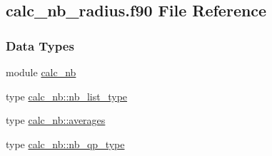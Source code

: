 \hypertarget{calc__nb__radius_8f90}{\subsection{calc\-\_\-nb\-\_\-radius.\-f90 File Reference}
\label{calc__nb__radius_8f90}
}
\subsubsection*{Data Types}
\begin{DoxyCompactItemize}
\item 
module \hyperlink{classcalc__nb}{calc\-\_\-nb}
\item 
type \hyperlink{structcalc__nb_1_1nb__list__type}{calc\-\_\-nb\-::nb\-\_\-list\-\_\-type}
\item 
type \hyperlink{structcalc__nb_1_1averages}{calc\-\_\-nb\-::averages}
\item 
type \hyperlink{structcalc__nb_1_1nb__qp__type}{calc\-\_\-nb\-::nb\-\_\-qp\-\_\-type}
\end{DoxyCompactItemize}
